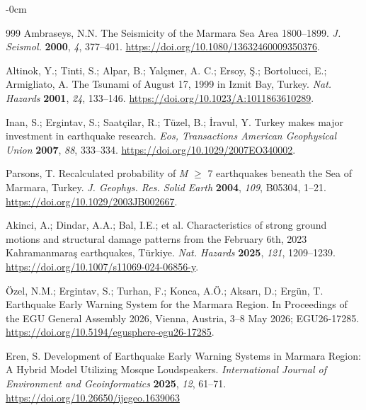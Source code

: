 \documentclass[data,article,accept,pdftex,moreauthors]{Definitions/mdpi}
\begin{document}
\begin{adjustwidth}{-\extralength}{0cm}
\begin{thebibliography}{999}
Ambraseys, N.N. The Seismicity of the Marmara Sea Area 1800--1899. \emph{J. Seismol.} \textbf{2000}, \emph{4}, 377--401. \url{https://doi.org/10.1080/13632460009350376}. %

Altinok, Y.; Tinti, S.; Alpar, B.; Yalçıner, A. C.; Ersoy, Ş.; Bortolucci, E.; Armigliato, A. The Tsunami of August 17, 1999 in Izmit Bay, Turkey. \emph{Nat. Hazards} \textbf{2001}, \emph{24}, 133--146. \url{https://doi.org/10.1023/A:1011863610289}. %

Inan, S.; Ergintav, S.; Saatçilar, R.; Tüzel, B.; İravul, Y. Turkey makes major investment in earthquake research. \emph{Eos, Transactions American Geophysical Union} \textbf{2007}, \emph{88}, 333--334. \url{https://doi.org/10.1029/2007EO340002}. %

Parsons, T. Recalculated probability of \emph{M} $\geq$ 7 earthquakes beneath the Sea of Marmara, Turkey. \emph{J. Geophys. Res. Solid Earth} \textbf{2004}, \emph{109}, B05304, 1--21. %
\url{https://doi.org/10.1029/2003JB002667}.

Akinci, A.; Dindar, A.A.; Bal, I.E.; et al. Characteristics of strong ground motions and structural damage patterns from the February 6th, 2023 Kahramanmara\c{s} earthquakes, Türkiye. \emph{Nat. Hazards} \textbf{2025}, \emph{121}, 1209--1239. \url{https://doi.org/10.1007/s11069-024-06856-y}.

Özel, N.M.; Ergintav, S.; Turhan, F.; Konca, A.Ö.; Aksarı, D.; Ergün, T. Earthquake Early Warning System for the Marmara Region. In Proceedings of the EGU General Assembly 2026, Vienna, Austria, 3--8 May 2026; %
 EGU26-17285. \url{https://doi.org/10.5194/egusphere-egu26-17285}.

Eren, S. Development of Earthquake Early Warning Systems in Marmara Region: A Hybrid Model Utilizing Mosque Loudspeakers. \emph{International Journal of Environment and Geoinformatics} \textbf{2025}, \emph{12}, 61--71. \url{https://doi.org/10.26650/ijegeo.1639063}%


\end{thebibliography}
\end{adjustwidth}
\end{document}
